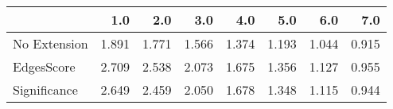 \begin{tabular}{lrrrrrrr}
\toprule
{} &   1.0 &   2.0 &   3.0 &   4.0 &   5.0 &   6.0 &   7.0 \\
\midrule
No Extension & 1.891 & 1.771 & 1.566 & 1.374 & 1.193 & 1.044 & 0.915 \\
EdgesScore   & 2.709 & 2.538 & 2.073 & 1.675 & 1.356 & 1.127 & 0.955 \\
Significance & 2.649 & 2.459 & 2.050 & 1.678 & 1.348 & 1.115 & 0.944 \\
\bottomrule
\end{tabular}
